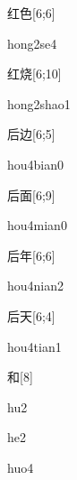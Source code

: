 \begin{verbete}[hong2se4]{红色}[6;6]
\begin{pronuncia}{hong2se4}
\end{pronuncia}
\end{verbete}

\begin{verbete}{红烧}[6;10]
\begin{pronuncia}{hong2shao1}
\end{pronuncia}
\end{verbete}

\begin{verbete}{后边}[6;5]
\begin{pronuncia}{hou4bian0}
\end{pronuncia}
\end{verbete}

\begin{verbete}{后面}[6;9]
\begin{pronuncia}{hou4mian0}
\end{pronuncia}
\end{verbete}

\begin{verbete}{后年}[6;6]
\begin{pronuncia}{hou4nian2}
\end{pronuncia}
\end{verbete}

\begin{verbete}{后天}[6;4]
\begin{pronuncia}{hou4tian1}
\end{pronuncia}
\end{verbete}

\begin{verbete}[hu2]{和}[8]
\begin{pronuncia}{hu2}
\end{pronuncia}
\begin{pronuncia}{he2}
\end{pronuncia}
\begin{pronuncia}{huo4}
\end{pronuncia}
\end{verbete}


